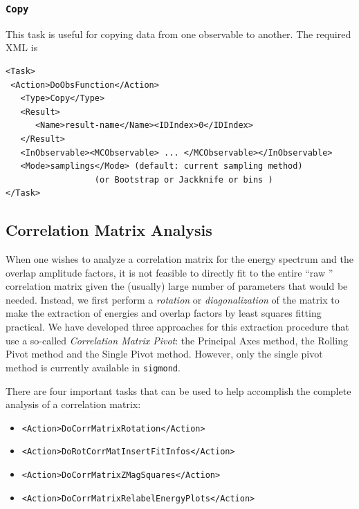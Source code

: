 \documentclass[12pt]{article}
\newcommand{\vb}{\texttt}
\begin{document}
\subsubsection{\vb{Copy}}                                                                      
This task is useful for copying data from one observable to another.
The required XML is                      
\begin{verbatim}
<Task>                                                                   
 <Action>DoObsFunction</Action>                                          
   <Type>Copy</Type>                                                     
   <Result>                                                              
      <Name>result-name</Name><IDIndex>0</IDIndex>                       
   </Result>                                                             
   <InObservable><MCObservable> ... </MCObservable></InObservable>       
   <Mode>samplings</Mode> (default: current sampling method)             
                  (or Bootstrap or Jackknife or bins )                   
</Task>                                                                  
\end{verbatim}



\subsection{Correlation Matrix Analysis} 
\label{sec:corrmatanal}
When one wishes to analyze a correlation matrix for the energy spectrum and
the overlap amplitude factors, it is not feasible to directly fit to the entire
``raw '' correlation matrix given the (usually) large number of parameters that
would be needed.  Instead, we first perform a \textit{rotation} or \textit{diagonalization}
of the matrix to make the extraction of energies and overlap factors by least squares 
fitting practical. We have developed three approaches for this extraction procedure that 
use a so-called \textit{Correlation Matrix Pivot}: the Principal Axes method, the
Rolling Pivot method and the Single Pivot method.  However, only the single pivot
method is currently available in \vb{sigmond}.

There are four important tasks that can be used to help accomplish the complete
analysis of a correlation matrix:
\begin{itemize}
\item
\vb{<Action>DoCorrMatrixRotation</Action>}
\item                                              
\vb{<Action>DoRotCorrMatInsertFitInfos</Action>}        
\item                                              
\vb{<Action>DoCorrMatrixZMagSquares</Action>}   
\item                                              
\vb{<Action>DoCorrMatrixRelabelEnergyPlots</Action>}
\end{itemize}
\end{document}
